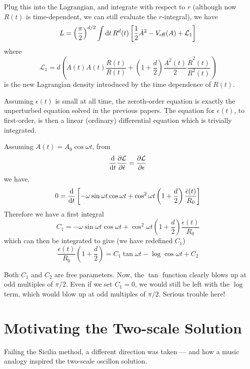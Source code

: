 \documentclass{report}
\begin{document}
Plug this into the Lagrangian, and integrate with respect to $r$ (although now $R(t)$ is time-dependent, we can still evaluate the $r$-integral), we have
\begin{equation}
 L = \left(\frac{\pi}{2}\right)^{d/2}\int {\rm d}t\, R^d(t) \left[ \frac{1}{2}\dot{A}^2 - V_{\rm eff} (A) +
    \mathcal{L}_1\right]
\end{equation}
where
\begin{equation}
  \mathcal{L}_1 = d\left( \dot{A}(t)A(t)\frac{\dot{R}(t)}{R(t)} +\left(1+\frac{d}{2}\right)\frac{A^2(t)}{2}\frac{\dot{R}^2(t)}{R^2(t)}\right)
\end{equation}
is the new Lagrangian density introduced by the time dependence of $R(t)$.

Assuming $\epsilon(t)$ is small at all time, the zeroth-order equation is exactly the unperturbed equation solved in the previous papers. The equation for $\epsilon(t)$, to first-order, is then a linear (ordinary) differential equation which is trivially integrated.

Assuming $A(t)=A_0\cos\omega t$, from
\begin{equation}
  \frac{\rm d}{{\rm d}t}\frac{\partial \mathcal{L}}{\partial \dot{\epsilon}} =
  \frac{\partial\mathcal{L}}{\partial \epsilon}
\end{equation}
we have,
\begin{equation}
  0 = \frac{\rm d}{{\rm d}t}\left[-\omega\sin\omega t\cos\omega t + \cos^2\omega t\left(1+\frac{d}{2}
    \right)\frac{\dot{\epsilon}(t)}{R_0}\right]
\end{equation}
Therefore we have a first integral
\begin{equation}
  C_1 = -\omega\sin\omega t\cos\omega t + \cos^2\omega t\left(1+\frac{d}{2}
  \right)\frac{\dot{\epsilon}(t)}{R_0}
\end{equation}
which can then be integrated to give (we have redefined $C_1$)
\begin{equation}\label{sol}
  \frac{\epsilon(t)}{R_0}\left(1+\frac{d}{2}\right)
  = C_1\tan\omega t  - \log\cos\omega t + C_2
\end{equation}

Both $C_1$ and $C_2$ are free parameters. Now, the $\tan$ function clearly blows up at odd multiples of $\pi/2$. Even if we set $C_1=0$, we would still be left with the $\log$ term, which would blow up at odd multiples of $\pi/2$. Serious trouble here!

\chapter{Motivating the Two-scale Solution}
Failing the Sicilia method, a different direction was taken --- and how a music analogy inspired the two-scale oscillon solution.
\end{document}
